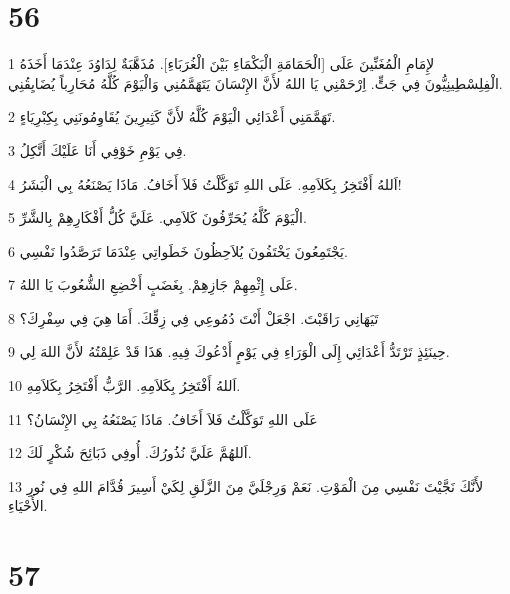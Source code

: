 \chapter{56}

\par 1 لإِمَامِ الْمُغَنِّينَ عَلَى [الْحَمَامَةِ الْبَكْمَاءِ بَيْنَ الْغُرَبَاءِ]. مُذَهَّبَةٌ لِدَاوُدَ عِنْدَمَا أَخَذَهُ الْفِلِسْطِينِيُّونَ فِي جَتٍَّ. اِرْحَمْنِي يَا اللهُ لأَنَّ الإِنْسَانَ يَتَهَمَّمُنِي وَالْيَوْمَ كُلَّهُ مُحَارِباً يُضَايِقُنِي.
\par 2 تَهَمَّمَنِي أَعْدَائِي الْيَوْمَ كُلَّهُ لأَنَّ كَثِيرِينَ يُقَاوِمُونَنِي بِكِبْرِيَاءٍ.
\par 3 فِي يَوْمِ خَوْفِي أَنَا عَلَيْكَ أَتَّكِلُ.
\par 4 اَللهُ أَفْتَخِرُ بِكَلاَمِهِ. عَلَى اللهِ تَوَكَّلْتُ فَلاَ أَخَافُ. مَاذَا يَصْنَعُهُ بِي الْبَشَرُ!
\par 5 الْيَوْمَ كُلَّهُ يُحَرِّفُونَ كَلاَمِي. عَلَيَّ كُلُّ أَفْكَارِهِمْ بِالشَّرِّ.
\par 6 يَجْتَمِعُونَ يَخْتَفُونَ يُلاَحِظُونَ خَطَواتِي عِنْدَمَا تَرَصَّدُوا نَفْسِي.
\par 7 عَلَى إِثْمِهِمْ جَازِهِمْ. بِغَضَبٍ أَخْضِعِ الشُّعُوبَ يَا اللهُ.
\par 8 تَيَهَانِي رَاقَبْتَ. اجْعَلْ أَنْتَ دُمُوعِي فِي زِقِّكَ. أَمَا هِيَ فِي سِفْرِكَ؟
\par 9 حِينَئِذٍ تَرْتَدُّ أَعْدَائِي إِلَى الْوَرَاءِ فِي يَوْمٍ أَدْعُوكَ فِيهِ. هَذَا قَدْ عَلِمْتُهُ لأَنَّ اللهَ لِي.
\par 10 اَللهُ أَفْتَخِرُ بِكَلاَمِهِ. الرَّبُّ أَفْتَخِرُ بِكَلاَمِهِ.
\par 11 عَلَى اللهِ تَوَكَّلْتُ فَلاَ أَخَافُ. مَاذَا يَصْنَعُهُ بِي الإِنْسَانُ؟
\par 12 اَللهُمَّ عَلَيَّ نُذُورُكَ. أُوفِي ذَبَائِحَ شُكْرٍ لَكَ.
\par 13 لأَنَّكَ نَجَّيْتَ نَفْسِي مِنَ الْمَوْتِ. نَعَمْ وَرِجْلَيَّ مِنَ الزَّلَقِ لِكَيْ أَسِيرَ قُدَّامَ اللهِ فِي نُورِ الأَحْيَاءِ.

\chapter{57}

